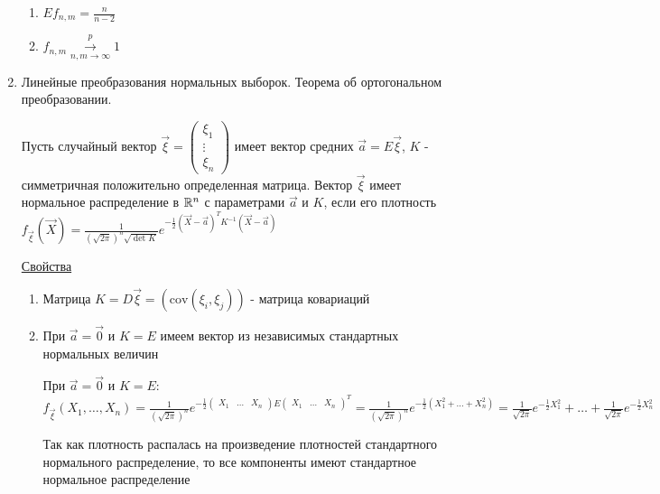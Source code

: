 \documentclass[12pt]{article}
\begin{document}
\begin{enumerate}
    \begin{enumerate}
        \item $E f_{n,m} = \frac{n}{n - 2}$

        \item $f_{n,m} \overset{p}{\underset{n, m \to \infty}{\longrightarrow}} 1$
    \end{enumerate}

    \item Линейные преобразования нормальных выборок. Теорема об ортогональном преобразовании.

    \Def Пусть случайный вектор $\vec \xi = \begin{pmatrix}\xi_1 \\ \vdots \\ \xi_n\end{pmatrix}$ имеет вектор средних 
    $\vec a = E \vec \xi$, $K$ - симметричная положительно определенная матрица. Вектор $\vec \xi$ 
    имеет нормальное распределение в $\mathbb{R}^n$ с параметрами $\vec a$ и $K$, если его плотность 
    $f_{\vec \xi} (\vec X) = \frac{1}{\left(\sqrt{2\pi}\right)^n \sqrt{\det K}} e^{-\frac{1}{2} (\vec X - \vec a)^T K^{-1} (\vec X - \vec a)}$


    \underline{Свойства}

    \begin{enumerate}
        \item Матрица $K = D \vec \xi = \left(\mathrm{cov} (\xi_i, \xi_j)\right)$ - матрица ковариаций

        \item При $\vec a = \vec 0$ и $K = E$ имеем вектор из независимых стандартных нормальных величин

        \begin{MyProof}
            При $\vec a = \vec 0$ и $K = E$: $f_{\vec \xi} (X_1, \dots, X_n) = \frac{1}{\left(\sqrt{2\pi}\right)^n} 
            e^{-\frac{1}{2} \begin{pmatrix}X_1 & \dots & X_n\end{pmatrix} E \begin{pmatrix}X_1 & \dots & X_n\end{pmatrix}^T} = 
            \frac{1}{\left(\sqrt{2\pi}\right)^n} e^{-\frac{1}{2} (X_1^2 + \dots + X_n^2)} = 
            \frac{1}{\sqrt{2\pi}} e^{-\frac{1}{2} X_1^2} + \dots + \frac{1}{\sqrt{2\pi}} e^{-\frac{1}{2} X_n^2}$

            Так как плотность распалась на произведение плотностей стандартного нормального распределение, то все компоненты имеют стандартное нормальное распределение
        \end{MyProof}


\end{enumerate}
\end{enumerate}
\end{document}
